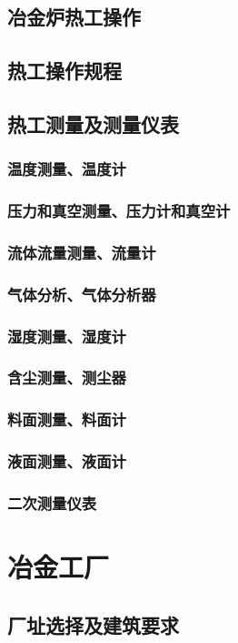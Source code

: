 \documentclass[UTF8]{../../ApplicationUniverse}
\begin{document}
    \subsection{冶金炉热工操作}
    \subsection{热工操作规程}
    \subsection{热工测量及测量仪表}
        \subsubsection{温度测量、温度计}
        \subsubsection{压力和真空测量、压力计和真空计}
        \subsubsection{流体流量测量、流量计}
        \subsubsection{气体分析、气体分析器}
        \subsubsection{湿度测量、湿度计}
        \subsubsection{含尘测量、测尘器}
        \subsubsection{料面测量、料面计}
        \subsubsection{液面测量、液面计}
        \subsubsection{二次测量仪表}
\section{冶金工厂}
    \subsection{厂址选择及建筑要求}
\end{document}
